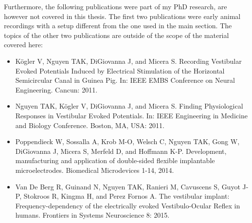 Furthermore, the following publications were part of my PhD research, are
however not covered in this thesis. The first two publications were early animal recordings with a setup different from the one used in the main section. The topics of the other two publications are outside of the scope of the material covered here:
\begin{itemize}
\item Kögler V, Nguyen TAK, DiGiovanna J, and Micera S. Recording Vestibular Evoked Potentials Induced by Electrical Stimulation of the Horizontal Semicircular Canal in Guinea Pig. In: IEEE EMBS Conference on Neural Engineering. Cancun: 2011.
\item Nguyen TAK, Kögler V, DiGiovanna J, and Micera S. Finding Physiological Responses in Vestibular Evoked Potentials. In: IEEE Engineering in Medicine and Biology Conference. Boston, MA, USA: 2011.
\item Poppendieck W, Sossalla A, Krob M-O, Welsch C, Nguyen TAK, Gong W, DiGiovanna J, Micera S, Merfeld D, and Hoffmann K-P. Development, manufacturing and application of double-sided flexible implantable microelectrodes. Biomedical Microdevices 1-14, 2014.
\item Van De Berg R, Guinand N, Nguyen TAK, Ranieri M, Cavuscens S, Guyot J-P, Stokroos R, Kingma H, and Perez Fornos A. The vestibular implant: Frequency-dependency of the electrically evoked Vestibulo-Ocular Reflex in humans. Frontiers in Systems Neuroscience 8: 2015.
\end{itemize}

